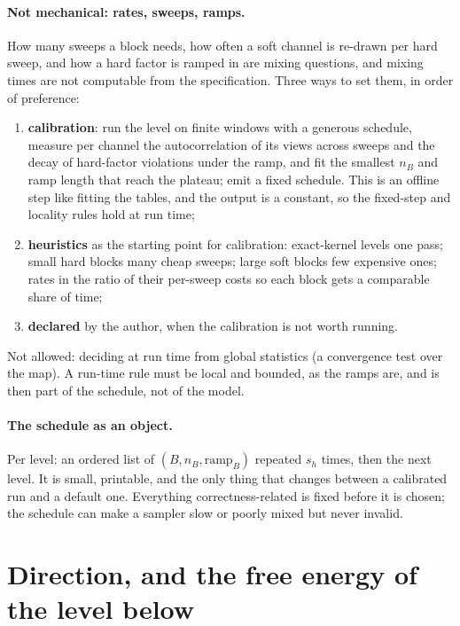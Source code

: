 \documentclass[11pt]{article}
\newcommand{\1}{\mathds{1}}
\begin{document}
\paragraph{Not mechanical: rates, sweeps, ramps.} How many sweeps a block
needs, how often a soft channel is re-drawn per hard sweep, and how a hard
factor is ramped in are mixing questions, and mixing times are not computable
from the specification. Three ways to set them, in order of preference:
\begin{enumerate}
  \item \textbf{calibration}: run the level on finite windows with a generous
        schedule, measure per channel the autocorrelation of its views across
        sweeps and the decay of hard-factor violations under the ramp, and fit
        the smallest $n_B$ and ramp length that reach the plateau; emit a fixed
        schedule. This is an offline step like fitting the tables, and the
        output is a constant, so the fixed-step and locality rules hold at run
        time;
  \item \textbf{heuristics} as the starting point for calibration: exact-kernel
        levels one pass; small hard blocks many cheap sweeps; large soft blocks
        few expensive ones; rates in the ratio of their per-sweep costs so each
        block gets a comparable share of time;
  \item \textbf{declared} by the author, when the calibration is not worth running.
\end{enumerate}
Not allowed: deciding at run time from global statistics (a convergence test
over the map). A run-time rule must be local and bounded, as the ramps are,
and is then part of the schedule, not of the model.

\paragraph{The schedule as an object.} Per level: an ordered list of
$(B, n_B, \text{ramp}_B)$ repeated $s_h$ times, then the next level. It is small,
printable, and the only thing that changes between a calibrated run and a
default one. Everything correctness-related is fixed before it is chosen; the
schedule can make a sampler slow or poorly mixed but never invalid.

\section{Direction, and the free energy of the level below}
\label{sec:direction}
\end{document}
